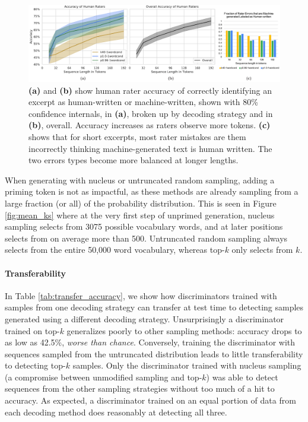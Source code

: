 \begin{figure}[t]
    \centering
    \includegraphics[width=\textwidth]{figures/human_merged}
    \caption{\textbf{(a)} and \textbf{(b)} show human rater accuracy of correctly identifying an excerpt as human-written or machine-written, shown with 80\% confidence internals, in \textbf{(a)}, broken up by decoding strategy and in \textbf{(b)}, overall. Accuracy increases as raters observe more tokens. \textbf{(c)} shows that for short excerpts, most rater mistakes are them incorrectly thinking machine-generated text is human written. The two errors types become more balanced at longer lengths.}
    \label{fig:human_eval} 
\end{figure}

When generating with nucleus or untruncated random sampling, adding a priming token is not as impactful, as these methods are already sampling from a large fraction (or all) of the probability distribution.
This is seen in Figure \ref{fig:mean_ks} where at the very first step of unprimed generation, nucleus sampling selects from 3075 possible vocabulary words, and at later positions selects from on average more than 500.
Untruncated random sampling always selects from the entire 50,000 word vocabulary, whereas top-$k$ only selects from $k$.


\paragraph{Transferability}
In Table \ref{tab:transfer_accuracy}, we show how discriminators trained with samples from one decoding strategy can transfer at test time to detecting samples generated using a different decoding strategy.
Unsurprisingly a discriminator trained on top-$k$ generalizes poorly to other sampling methods: accuracy drops to as low as 42.5\%, \textit{worse than chance}.
Conversely, training the discriminator with sequences sampled from the untruncated distribution leads to little transferability to detecting top-$k$ samples.
Only the discriminator trained with nucleus sampling (a compromise between unmodified sampling and top-$k$) was able to detect sequences from the other sampling strategies without too much of a hit to accuracy.
As expected, a discriminator trained on an equal portion of data from each decoding method does reasonably at detecting all three.


